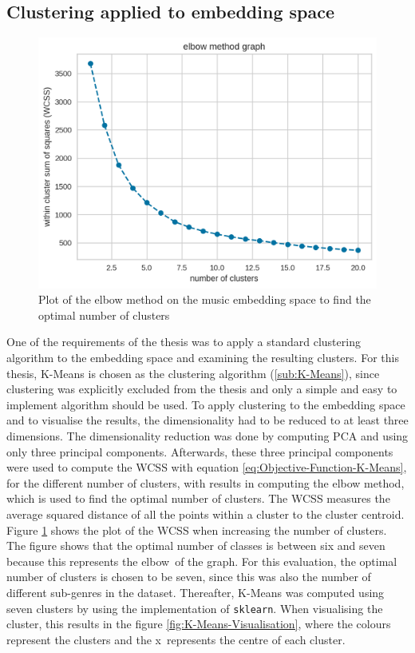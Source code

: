\subsection{Clustering applied to embedding space}
\label{sub:Results-Music-Clustering}
\begin{figure}[ht]
\centering
    \includegraphics[width=0.6\linewidth]{img/elbow_method_music_dataset.png}
    \caption{Plot of the elbow method on the music embedding space to find the optimal number of clusters}
    \label{fig:Elbow-Clusters}
\end{figure}
\noindent
One of the requirements of the thesis was to apply a standard clustering algorithm to the embedding space and examining the resulting clusters. For this thesis, K-Means is chosen as the clustering algorithm (\ref{sub:K-Means}), since clustering was explicitly excluded from the thesis and only a simple and easy to implement algorithm should be used. To apply clustering to the embedding space and to visualise the results, the dimensionality had to be reduced to at least three dimensions. The dimensionality reduction was done by computing \gls{PCA} and using only three principal components. Afterwards, these three principal components were used to compute the \gls{WCSS} with equation \ref{eq:Objective-Function-K-Means}, for the different number of clusters, with results in computing the elbow method, which is used to find the optimal number of clusters. The \gls{WCSS} measures the average squared distance of all the points within a cluster to the cluster centroid. Figure \ref{fig:Elbow-Clusters} shows the plot of the \gls{WCSS} when increasing the number of clusters. The figure shows that the optimal number of classes is between six and seven because this represents the \flqq elbow\frqq \ of the graph. For this evaluation, the optimal number of clusters is chosen to be seven, since this was also the number of different sub-genres in the dataset. Thereafter, K-Means was computed using seven clusters by using the implementation of \texttt{sklearn}. When visualising the cluster, this results in the figure \ref{fig:K-Means-Visualisation}, where the colours represent the clusters and the \flqq x\frqq \ represents the centre of each cluster.
